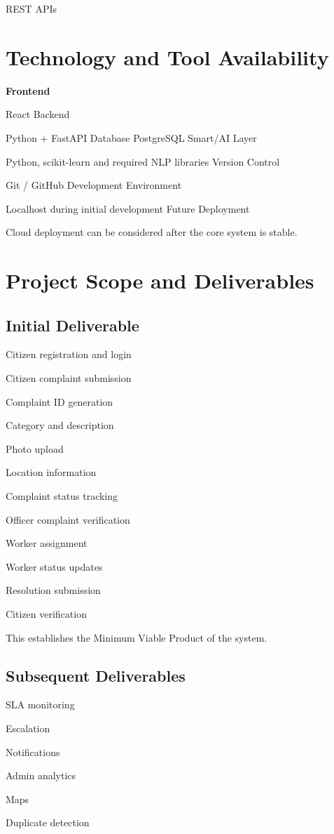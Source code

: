 \documentclass[12pt,a4paper]{article}
\begin{document}
REST APIs

\section{Technology and Tool Availability}
\textbf{Frontend}\par
React Backend

Python + FastAPI Database PostgreSQL Smart/AI Layer

Python, scikit-learn and required NLP libraries Version Control

Git / GitHub Development Environment

Localhost during initial development Future Deployment

Cloud deployment can be considered after the core system is stable.

\section{Project Scope and Deliverables}
\subsection{Initial Deliverable}
Citizen registration and login

Citizen complaint submission

Complaint ID generation

Category and description

Photo upload

Location information

Complaint status tracking

Officer complaint verification

Worker assignment

Worker status updates

Resolution submission

Citizen verification

This establishes the Minimum Viable Product of the system.

\subsection{Subsequent Deliverables}
SLA monitoring

Escalation

Notifications

Admin analytics

Maps

Duplicate detection
\end{document}
